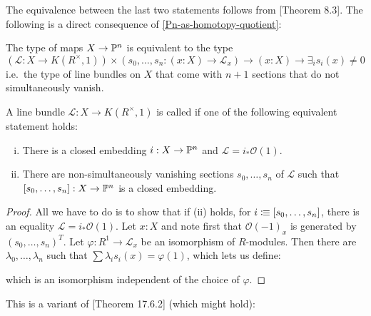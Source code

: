 The equivalence between the last two statements follows from \cite{cech-draft}[Theorem 8.3].
The following is a direct consequence of  \ref{Pn-as-homotopy-quotient}:

\begin{remark}
  The type of maps $X\to \mathbb{P}^n$ is equivalent to the type
  \[
  (\mathcal L:X\to K(R^\times,1))\times (s_0,\dots,s_n:(x:X)\to \mathcal L_x) \to (x:X) \to \exists_{i} s_i(x)\neq 0
  \]
  i.e.\ the type of line bundles on $X$ that come with $n+1$ sections that do not simultaneously vanish.
\end{remark}

\begin{definition}
  A line bundle $\mathcal L:X\to K(R^\times,1)$ is called 
  if one of the following equivalent statement holds:
  \begin{enumerate}[(i)]
  \item There is a closed embedding $i:X\to \mathbb{P}^n$ and $\mathcal L=i_\ast \mathcal O(1)$.
  \item There are non-simultaneously vanishing sections $s_0,\dots,s_n$ of $\mathcal L$
    such that $[s_0,\dots,s_n]:X\to \mathbb{P}^n$ is a closed embedding.
  \end{enumerate}
\end{definition}

\begin{proof}
  All we have to do is to show that if (ii) holds, for $i\vcentcolon\mspace{-1.2mu}\equiv [s_0,\dots,s_n]$,
  there is an equality $\mathcal L=i_\ast \mathcal O(1)$.
  Let $x:X$ and note first that $\mathcal O(-1)_x$ is generated by $(s_0,\dots,s_n)^T$.
  Let $\varphi:R^1\to \mathcal L_x$ be an isomorphism of $R$-modules.
  Then there are $\lambda_0,\dots,\lambda_n$ such that $\sum \lambda_i s_i(x) =\varphi(1)$,
  which lets us define:
  \begin{center}
  \end{center}
  which is an isomorphism independent of the choice of $\varphi$.
\end{proof}


This is a variant of \cite{vakil}[Theorem 17.6.2] (which might hold):

